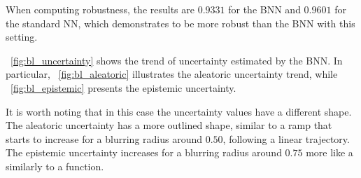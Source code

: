 When computing robustness, the results are $0.9331$ for the BNN and $0.9601$ for the standard NN, which demonstrates to be more robust than the BNN with this setting.

\Fig~\ref{fig:bl_uncertainty} shows the trend of uncertainty estimated by the BNN. In particular, \Fig~\ref{fig:bl_aleatoric} illustrates the aleatoric uncertainty trend, while \Fig~\ref{fig:bl_epistemic} presents the epistemic uncertainty.

It is worth noting that in this case the uncertainty values have a different shape. The aleatoric uncertainty has a more outlined shape, similar to a ramp that starts to increase for a blurring radius around $0.50$, following a linear trajectory. The epistemic uncertainty increases for a blurring radius around $0.75$ more like a similarly to a function.

